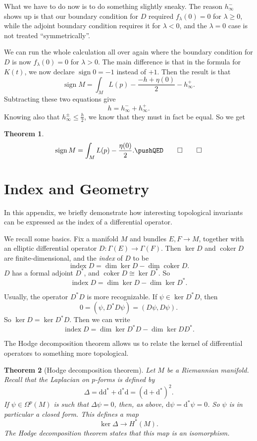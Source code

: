 \documentclass{shortart}
\newtheorem{thm}{Theorem}[section]
\theoremstyle{definition}
\renewcommand\d{\mathrm{d}}
\DeclareMathOperator\coker{coker}
\DeclareMathOperator\idx{index}
\DeclareMathOperator\sign{sign}
\begin{document}
What we have to do now is to do something slightly sneaky. The reason $h^-_\infty$ shows up is that our boundary condition for $D$ required $f_\lambda(0) = 0$ for $\lambda \geq 0$, while the adjoint boundary condition requires it for $\lambda < 0$, and the $\lambda =  0$ case is not treated ``symmetrically''.

We can run the whole calculation all over again where the boundary condition for $D$ is now $f_\lambda(0) = 0$ for $\lambda > 0$. The main difference is that in the formula for $K(t)$, we now declare $\sign 0 = -1$ instead of $+1$. Then the result is that
\[
  \sign M = \int_M L(p) - \frac{-h + \eta(0)}{2} - h_\infty^+.
\]
Subtracting these two equations give
\[
  h = h_\infty^- + h_\infty^+.
\]
Knowing also that $h_\infty^{\pm} \leq \frac{h}{2}$, we know that they must in fact be equal. So we get
\begin{thm}
  \[
    \sign M = \int_M L(p) - \frac{\eta(0)}{2}.\fakeqed
  \]\ifplastex\fakeqed\fi
\end{thm}

\appendices
\section{Index and Geometry}\label{section:index-and-geometry}
In this appendix, we briefly demonstrate how interesting topological invariants can be expressed as the index of a differential operator.

We recall some basics. Fix a manifold $M$ and bundles $E, F \to M$, together with an elliptic differential operator $D\colon \Gamma(E) \to \Gamma(F)$. Then $\ker D$ and $\coker D$ are finite-dimensional, and the \emph{index} of $D$ to be
\[
  \idx D = \dim \ker D - \dim \coker D.
\]
$D$ has a formal adjoint $D^*$, and $\coker D \cong \ker D^*$. So
\[
  \idx D = \dim \ker D - \dim \ker D^*.
\]

Usually, the operator $D^*D$ is more recognizable. If $\psi \in \ker D^*D$, then
\[
  0 = (\psi, D^*D\psi) = (D\psi, D \psi).
\]
So $\ker D = \ker D^*D$. Then we can write
\[
  \idx D = \dim \ker D^*D - \dim \ker DD^*.
\]

The Hodge decomposition theorem allows us to relate the kernel of differential operators to something more topological.

\begin{thm}[Hodge decomposition theorem]
  Let $M$ be a Riemannian manifold. Recall that the Laplacian on $p$-forms is defined by
  \[
    \Delta = \d\d^* + \d^*\d = (\d + \d^*)^2.
  \]
  If $\psi \in \Omega^p(M)$ is such that $\Delta \psi = 0$, then, as above, $\d \psi = \d^* \psi = 0$. So $\psi$ is in particular a closed form. This defines a map
  \[
    \ker \Delta \to H^*(M).
  \]
  The Hodge decomposition theorem states that this map is an isomorphism.
\end{thm}
\end{document}
